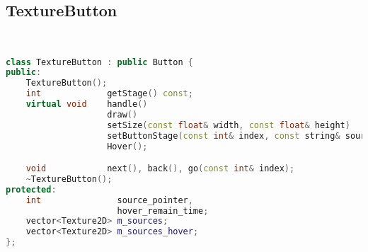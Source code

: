 \subsection{TextureButton}
\begin{lstlisting}[language=C++]


class TextureButton : public Button {
public:
    TextureButton();
    int             getStage() const;
    virtual void    handle()                                            override,
                    draw()                                              override,
                    setSize(const float& width, const float& height)    override,
                    setButtonStage(const int& index, const string& source, const string& hover_source),
                    Hover();

    void            next(), back(), go(const int& index);
    ~TextureButton();
protected:
    int               source_pointer,
                      hover_remain_time;
    vector<Texture2D> m_sources;
    vector<Texture2D> m_sources_hover;
};





\end{lstlisting}
